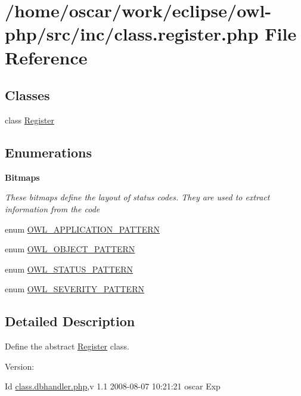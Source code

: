 \hypertarget{class_8register_8php}{
\section{/home/oscar/work/eclipse/owl-php/src/inc/class.register.php File Reference}
\label{class_8register_8php}
}
\subsection*{Classes}
\begin{CompactItemize}
\item 
class \hyperlink{classRegister}{Register}
\end{CompactItemize}
\subsection*{Enumerations}
\begin{Indent}{\bf Bitmaps}\par
{\em These bitmaps define the layout of status codes. They are used to extract information from the code }\begin{CompactItemize}
\item 
enum \hyperlink{class_8register_8php_22359c406b8745e8fa2412ec96d5e74c}{OWL\_\-APPLICATION\_\-PATTERN} 
\item 
enum \hyperlink{class_8register_8php_ac5ed52fb1bbffdff69e9a24c40962f5}{OWL\_\-OBJECT\_\-PATTERN} 
\item 
enum \hyperlink{class_8register_8php_0a8649e9ad7fa654df2c41aa4ba1283c}{OWL\_\-STATUS\_\-PATTERN} 
\item 
enum \hyperlink{class_8register_8php_eb9363fcaa1cd911762ff88518a9d973}{OWL\_\-SEVERITY\_\-PATTERN} 
\end{CompactItemize}
\end{Indent}


\subsection{Detailed Description}
Define the abstract \hyperlink{classRegister}{Register} class. \begin{Desc}
\item[Version:]\end{Desc}
\begin{Desc}
\item[Id]\hyperlink{class_8dbhandler_8php}{class.dbhandler.php},v 1.1 2008-08-07 10:21:21 oscar Exp \end{Desc}


